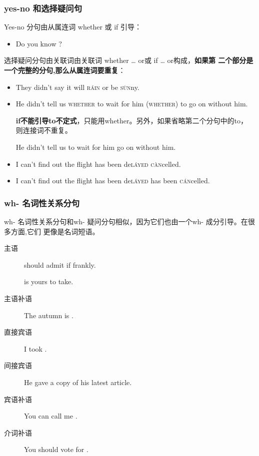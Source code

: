 \subsubsection{yes-no 和选择疑问句}

Yes-no 分句由从属连词 whether 或 if 引导：
\begin{itemize}
\item Do you know ?
\end{itemize}

选择疑问分句由关联词由关联词 whether \ldots{} or或 if \ldots{} or构成，\textbf{如果第
二个部分是一个完整的分句,那么从属连词要重复}：
\begin{itemize}
\item They didn't say  it will \textsc{r\'ain} or be \textsc{s\`un}ny.
\item He didn't tell us \textsc{whether} to wait for him 
  \textsc{(whether)} to go on without him.

  \textbf{if不能引导to不定式}，只能用whether。另外，如果省略第二个分句中的to，
  则连接词不重复。

  He didn't tell us  to wait for him  go on without him.

\item I can't find out  the flight has been de\textsc{l\'ayed}
   \textsc{c\`an}celled.

\item I can't find out  the flight has been de\textsc{l\'ayed} 
   has been \textsc{c\'an}celled.

\end{itemize}

\subsubsection{wh- 名词性关系分句}

wh- 名词性关系分句和wh- 疑问分句相似，因为它们也由一个wh- 成分引导。在很多方面,它们
更像是名词短语。
\begin{description}
\item[主语]  should admit if frankly.

   is yours to take.
\item[主语补语] The autumn is .
\item[直接宾语] I took .
\item[间接宾语] He gave  a copy of his latest article.
\item[宾语补语] You can call me .
\item[介词补语] You should vote for .
\end{description}

